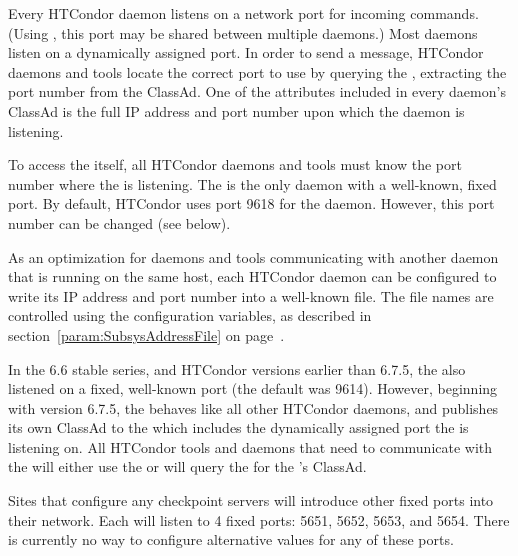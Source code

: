 Every HTCondor daemon listens on a network port for incoming commands.
(Using , this port may be shared between multiple
daemons.)
Most daemons listen on a dynamically assigned port.
In order to send a message,
HTCondor daemons and tools locate the correct port to use
by querying the ,
extracting the port number from the ClassAd.
One of the attributes included in every daemon's ClassAd is the full
IP address and port number upon which the daemon is listening.

To access the  itself,
all HTCondor daemons and tools
must know the port number  where the  is listening.
The  is the only daemon with a well-known,
fixed port.
By default, HTCondor uses port 9618 for the  daemon.
However, this port number can be changed (see below).

As an optimization for daemons and tools communicating with another
daemon that is running on the same host,
each HTCondor daemon can be configured to
write its IP address and port number into a well-known file.
The file names are controlled using the 
configuration variables,
as described in section~\ref{param:SubsysAddressFile} on
page~\pageref{param:SubsysAddressFile}. 

\Note In the 6.6 stable series, and HTCondor versions earlier than
6.7.5, the  also listened on a fixed, well-known
port (the default was 9614).
However, beginning with version 6.7.5, the  behaves
like all other HTCondor daemons, and publishes its own ClassAd to the
 which includes the dynamically assigned port 
the  is listening on.
All HTCondor tools and daemons that need to communicate with the
 will either use the
 or will query the
 for the 's ClassAd.

Sites that configure any checkpoint servers will introduce
other fixed ports into their network.
Each  will listen to 4 fixed ports: 5651, 5652,
5653, and 5654.
There is currently no way to configure alternative values for any of
these ports.


